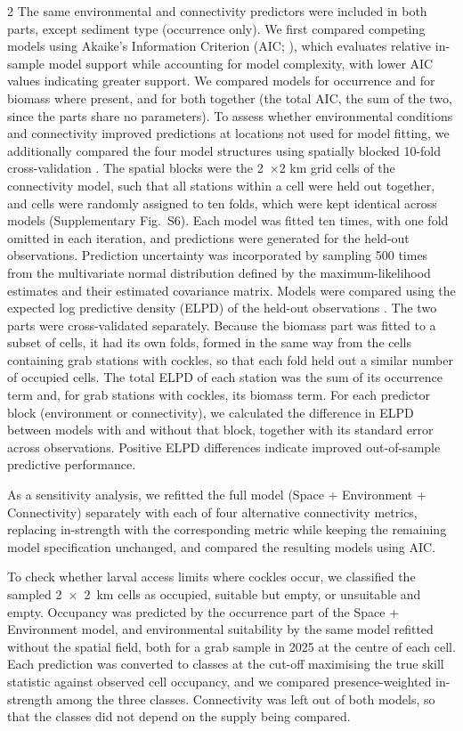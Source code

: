 \begin{spacing}{2}
The same environmental and connectivity predictors were included in both parts, except sediment type (occurrence only). We first compared competing models using Akaike’s Information Criterion (AIC; \citet{akaike1974}), which evaluates relative in-sample model support while accounting for model complexity, with lower AIC values indicating greater support. We compared models for occurrence and for biomass where present, and for both together (the total AIC, the sum of the two, since the parts share no parameters).
To assess whether environmental conditions and connectivity improved predictions at locations not used for model fitting, we additionally compared the four model structures using spatially blocked 10-fold cross-validation \citep{roberts2017crossvalidation}. The spatial blocks were the 2~$\times$2 km grid cells of the connectivity model, such that all stations within a cell were held out together, and cells were randomly assigned to ten folds, which were kept identical across models (Supplementary Fig.~S6). Each model was fitted ten times, with one fold omitted in each iteration, and predictions were generated for the held-out observations. Prediction uncertainty was incorporated by sampling 500 times from the multivariate normal distribution defined by the maximum-likelihood estimates and their estimated covariance matrix. Models were compared using the expected log predictive density (ELPD) of the held-out observations \citep{vehtari2017practical}. The two parts were cross-validated separately. Because the biomass part was fitted to a subset of cells, it had its own folds, formed in the same way from the cells containing grab stations with cockles, so that each
fold held out a similar number of occupied cells. The total ELPD of each station was the sum of its occurrence term and, for grab stations with cockles, its biomass term. For each predictor block (environment or connectivity), we calculated the difference in ELPD between models with and without that block, together with its standard error across observations. Positive ELPD differences indicate improved out-of-sample predictive performance.

As a sensitivity analysis, we refitted the full model (Space + Environment + Connectivity) separately with each of four alternative connectivity metrics, replacing in-strength with the corresponding metric while keeping the remaining model specification unchanged, and compared the resulting models using AIC.

To check whether larval access limits where cockles occur, we classified the sampled 2~$\times$~2~km cells as occupied, suitable but empty, or unsuitable and empty. Occupancy was predicted by the occurrence part of the Space + Environment model, and environmental suitability by the same model refitted without the spatial field, both for a grab sample in 2025 at the centre of each cell. Each prediction was converted to classes at the cut-off maximising the true skill statistic against observed cell occupancy, and we compared presence-weighted in-strength among the three classes. Connectivity was left out of both models, so that the classes did not depend on the supply being compared.


\end{spacing}
